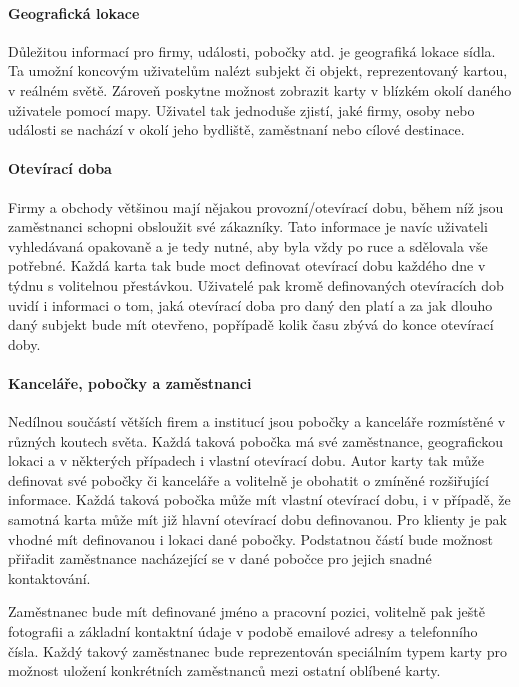 	\paragraph{Geografická lokace}

	Důležitou informací pro firmy, události, pobočky atd. je geografiká lokace sídla.
	Ta umožní koncovým uživatelům nalézt subjekt či objekt, reprezentovaný kartou, v reálném světě.
	Zároveň poskytne možnost zobrazit karty v blízkém okolí daného uživatele pomocí mapy.
	Uživatel tak jednoduše zjistí, jaké firmy, osoby nebo události se nachází v okolí jeho bydliště, zaměstnaní nebo
	cílové destinace.

	\paragraph{Otevírací doba}

	Firmy a obchody většinou mají nějakou provozní/otevírací dobu, během níž jsou zaměstnanci schopni obsloužit své zákazníky.
	Tato informace je navíc uživateli vyhledávaná opakovaně a je tedy nutné, aby byla vždy po ruce a sdělovala vše potřebné.
	Každá karta tak bude moct definovat otevírací dobu každého dne v týdnu s volitelnou přestávkou.
	Uživatelé pak kromě definovaných otevíracích dob uvidí i informaci o tom, jaká otevírací doba pro daný den platí
	a za jak dlouho daný subjekt bude mít otevřeno, popřípadě kolik času zbývá do konce otevírací doby.

	\paragraph{Kanceláře, pobočky a zaměstnanci}

	Nedílnou součástí větších firem a institucí jsou pobočky a kanceláře rozmístěné v různých koutech světa.
	Každá taková pobočka má své zaměstnance, geografickou lokaci a v některých případech i vlastní otevírací dobu.
	Autor karty tak může definovat své pobočky či kanceláře a volitelně je obohatit o zmíněné rozšiřující informace.
	Každá taková pobočka může mít vlastní otevírací dobu, i v případě, že samotná karta může mít již hlavní otevírací dobu
	definovanou.
	Pro klienty je pak vhodné mít definovanou i lokaci dané pobočky.
	Podstatnou částí bude možnost přiřadit zaměstnance nacházející se v dané pobočce pro jejich snadné kontaktování.

	Zaměstnanec bude mít definované jméno a pracovní pozici, volitelně pak ještě fotografii a základní kontaktní údaje
	v podobě emailové adresy a telefonního čísla.
	Každý takový zaměstnanec bude reprezentován speciálním typem karty pro možnost uložení konkrétních zaměstnanců mezi
	ostatní oblíbené karty.

